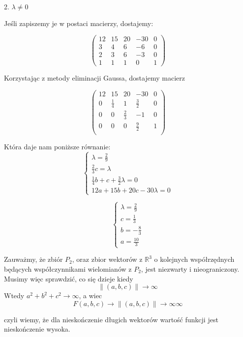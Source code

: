 \documentclass{article}[13pt]
\newcommand{\R}{\mathds{R}}
\begin{document}
    {\color{def}2. $\lambda\neq0$}
    \medskip

    Jeśli zapiszemy je w postaci macierzy, dostajemy:
    
    $$
        \begin{pmatrix}
            12 &15& 20& -30& 0\\
            3 & 4& 6& -6& 0\\
            2 &3& 6& -3& 0\\
            1& 1& 1& 0& 1
        \end{pmatrix}
    $$

    Korzystając z metody eliminacji Gaussa, dostajemy macierz

    $$
        \begin{pmatrix}
            12 & 15	& 20&	-30&	0\\
            0&	\frac14	&  1&	\frac32&	0\\
            0	&  0	&\frac23	 &-1&	0\\
            0	&  0	&  0&	\frac92	&1\\
        \end{pmatrix}
    $$

    Która daje nam poniższe równanie:
    $$
        \begin{cases}
            \lambda=\frac29\\
            \frac23c=\lambda\\
            \frac14b+c+\frac32\lambda=0\\
            12a+15b+20c-30\lambda=0
        \end{cases}
    $$

    $$
        \begin{cases}
            \lambda=\frac29\\
            c=\frac13\\
            b=-\frac83\\
            a=\frac{10}3
        \end{cases}
    $$

    Zauważmy, że zbiór $P_2$, oraz zbior wektorów z $\R^3$ o kolejnych współrzędnych będących współczynnikami wielomianów z $P_2$, jest niezwarty i nieograniczony. Musimy więc sprawdzić, co się dzieje kiedy
    $$\|(a,b,c)\|\to\infty$$
    Wtedy $a^2+b^2+c^2\to\infty$, a wiec 
    $$F(a,b,c)\xrightarrow{}{\|(a,b,c)\|\to\infty}\infty$$

    czyli wiemy, że dla nieskończenie długich wektorów wartość funkcji jest nieskończenie wysoka.
    \medskip
\end{document}
